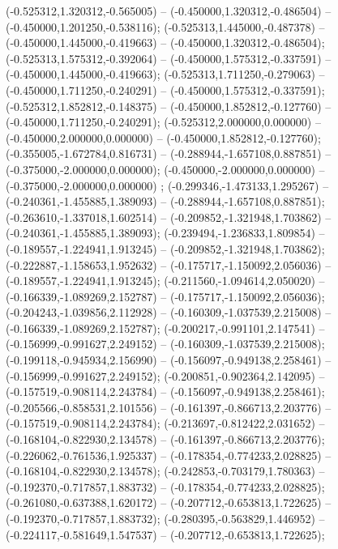  (-0.525312,1.320312,-0.565005) -- (-0.450000,1.320312,-0.486504) -- (-0.450000,1.201250,-0.538116);
 (-0.525313,1.445000,-0.487378) -- (-0.450000,1.445000,-0.419663) -- (-0.450000,1.320312,-0.486504);
 (-0.525313,1.575312,-0.392064) -- (-0.450000,1.575312,-0.337591) -- (-0.450000,1.445000,-0.419663);
 (-0.525313,1.711250,-0.279063) -- (-0.450000,1.711250,-0.240291) -- (-0.450000,1.575312,-0.337591);
 (-0.525312,1.852812,-0.148375) -- (-0.450000,1.852812,-0.127760) -- (-0.450000,1.711250,-0.240291);
 (-0.525312,2.000000,0.000000) -- (-0.450000,2.000000,0.000000) -- (-0.450000,1.852812,-0.127760);
 (-0.355005,-1.672784,0.816731) -- (-0.288944,-1.657108,0.887851) -- (-0.375000,-2.000000,0.000000);
 (-0.450000,-2.000000,0.000000) -- (-0.375000,-2.000000,0.000000) ;
 (-0.299346,-1.473133,1.295267) -- (-0.240361,-1.455885,1.389093) -- (-0.288944,-1.657108,0.887851);
 (-0.263610,-1.337018,1.602514) -- (-0.209852,-1.321948,1.703862) -- (-0.240361,-1.455885,1.389093);
 (-0.239494,-1.236833,1.809854) -- (-0.189557,-1.224941,1.913245) -- (-0.209852,-1.321948,1.703862);
 (-0.222887,-1.158653,1.952632) -- (-0.175717,-1.150092,2.056036) -- (-0.189557,-1.224941,1.913245);
 (-0.211560,-1.094614,2.050020) -- (-0.166339,-1.089269,2.152787) -- (-0.175717,-1.150092,2.056036);
 (-0.204243,-1.039856,2.112928) -- (-0.160309,-1.037539,2.215008) -- (-0.166339,-1.089269,2.152787);
 (-0.200217,-0.991101,2.147541) -- (-0.156999,-0.991627,2.249152) -- (-0.160309,-1.037539,2.215008);
 (-0.199118,-0.945934,2.156990) -- (-0.156097,-0.949138,2.258461) -- (-0.156999,-0.991627,2.249152);
 (-0.200851,-0.902364,2.142095) -- (-0.157519,-0.908114,2.243784) -- (-0.156097,-0.949138,2.258461);
 (-0.205566,-0.858531,2.101556) -- (-0.161397,-0.866713,2.203776) -- (-0.157519,-0.908114,2.243784);
 (-0.213697,-0.812422,2.031652) -- (-0.168104,-0.822930,2.134578) -- (-0.161397,-0.866713,2.203776);
 (-0.226062,-0.761536,1.925337) -- (-0.178354,-0.774233,2.028825) -- (-0.168104,-0.822930,2.134578);
 (-0.242853,-0.703179,1.780363) -- (-0.192370,-0.717857,1.883732) -- (-0.178354,-0.774233,2.028825);
 (-0.261080,-0.637388,1.620172) -- (-0.207712,-0.653813,1.722625) -- (-0.192370,-0.717857,1.883732);
 (-0.280395,-0.563829,1.446952) -- (-0.224117,-0.581649,1.547537) -- (-0.207712,-0.653813,1.722625);
